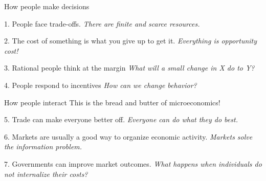 \documentclass[compress]{beamer}
\begin{document}
\begin{frame}{How people make decisions}
    \begin{block}{1. People face trade-offs.}
 \textit{       There are finite and scarce resources.}
    \end{block}

    \begin{block}{2. The cost of something is what you give up to get it.}
\textit{        Everything is opportunity cost!
}    \end{block}

    \begin{block}{3. Rational people think at the margin}
\textit{        What will a small change in X do to Y?
}    \end{block}

    \begin{block}{4. People respond to incentives}
\textit{        How can we change behavior?
}    \end{block}
\end{frame} 

\begin{frame}{How people interact}
    This is the bread and butter of microeconomics!
    
    \medskip

    \begin{block}{5. Trade can make everyone better off.}
\textit{        Everyone can do what they do best.
}    \end{block}

    \begin{block}{6. Markets are usually a good way to organize economic activity.}
\textit{        Markets solve the information problem.
}    \end{block}

    \begin{block}{7. Governments can improve market outcomes.}
\textit{        What happens when individuals do not internalize their costs?
}    \end{block}
\end{frame} 
\end{document}
